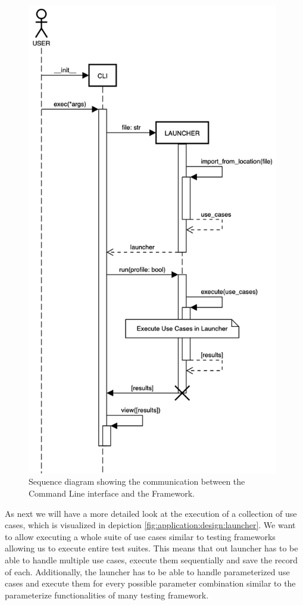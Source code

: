 \begin{figure}[h]
    \centering
    \includegraphics[width=11cm]{resources/img/sequence/cli}
    \caption{
        Sequence diagram showing the communication between the Command Line
        interface and the Framework.
    }
    \label{fig:application:design:cli}
\end{figure}

As next we will have a more detailed look at the execution of a collection of
use cases, which is visualized in depiction
\ref{fig:application:design:launcher}. We want to allow executing a whole suite
of use cases similar to testing frameworks allowing us to execute entire test
suites. This means that out launcher has to be able to handle multiple use
cases, execute them sequentially and save the record of each. Additionally, the
launcher has to be able to handle parameterized use cases and execute them for
every possible parameter combination similar to the parameterize functionalities
of many testing framework. 

